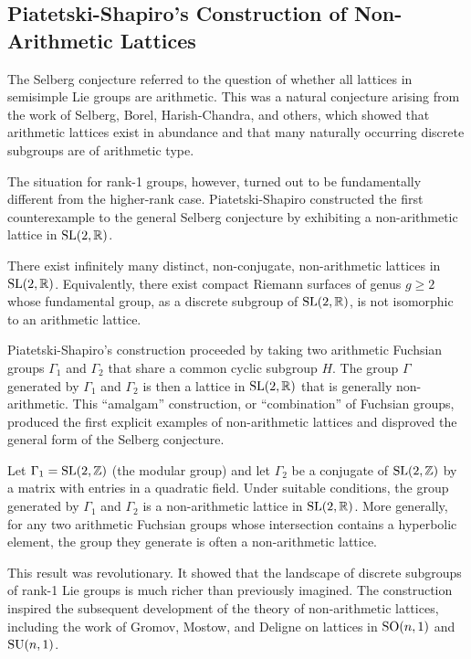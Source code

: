 \subsection{Piatetski-Shapiro's Construction of Non-Arithmetic Lattices}

The Selberg conjecture referred to the question of whether all lattices in semisimple Lie groups are arithmetic. This was a natural conjecture arising from the work of Selberg, Borel, Harish-Chandra, and others, which showed that arithmetic lattices exist in abundance and that many naturally occurring discrete subgroups are of arithmetic type.

The situation for rank-1 groups, however, turned out to be fundamentally different from the higher-rank case. Piatetski-Shapiro constructed the first counterexample to the general Selberg conjecture by exhibiting a non-arithmetic lattice in \(\operatorname{SL}(2,\mathbb{R})\).

\begin{theorem}
There exist infinitely many distinct, non-conjugate, non-arithmetic lattices in \(\operatorname{SL}(2,\mathbb{R})\). Equivalently, there exist compact Riemann surfaces of genus \(g \geq 2\) whose fundamental group, as a discrete subgroup of \(\operatorname{SL}(2,\mathbb{R})\), is not isomorphic to an arithmetic lattice.
\end{theorem}

Piatetski-Shapiro's construction proceeded by taking two arithmetic Fuchsian groups \(\Gamma_1\) and \(\Gamma_2\) that share a common cyclic subgroup \(H\). The group \(\Gamma\) generated by \(\Gamma_1\) and \(\Gamma_2\) is then a lattice in \(\operatorname{SL}(2,\mathbb{R})\) that is generally non-arithmetic. This ``amalgam'' construction, or ``combination'' of Fuchsian groups, produced the first explicit examples of non-arithmetic lattices and disproved the general form of the Selberg conjecture.

\begin{example}
Let \(\Gamma_1 = \operatorname{SL}(2,\mathbb{Z})\) (the modular group) and let \(\Gamma_2\) be a conjugate of \(\operatorname{SL}(2,\mathbb{Z})\) by a matrix with entries in a quadratic field. Under suitable conditions, the group generated by \(\Gamma_1\) and \(\Gamma_2\) is a non-arithmetic lattice in \(\operatorname{SL}(2,\mathbb{R})\). More generally, for any two arithmetic Fuchsian groups whose intersection contains a hyperbolic element, the group they generate is often a non-arithmetic lattice.
\end{example}

This result was revolutionary. It showed that the landscape of discrete subgroups of rank-1 Lie groups is much richer than previously imagined. The construction inspired the subsequent development of the theory of non-arithmetic lattices, including the work of Gromov, Mostow, and Deligne on lattices in \(\operatorname{SO}(n,1)\) and \(\operatorname{SU}(n,1)\).

